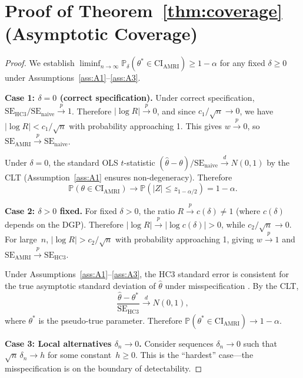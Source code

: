 \documentclass[12pt]{article}
\theoremstyle{definition}
\theoremstyle{remark}
\newcommand{\Prob}{\mathbb{P}}
\newcommand{\se}{\mathrm{SE}}
\newcommand{\CI}{\mathrm{CI}}
\newcommand{\plim}{\overset{p}{\to}}
\newcommand{\dlim}{\overset{d}{\to}}
\begin{document}
\section{Proof of Theorem~\ref{thm:coverage} (Asymptotic Coverage)}\label{app:thm2}

\begin{proof}
We establish $\liminf_{n \to \infty} \Prob_\delta(\theta^* \in \CI_{\mathrm{AMRI}}) \geq 1 - \alpha$ for any fixed $\delta \geq 0$ under Assumptions~\ref{ass:A1}--\ref{ass:A3}.

\textbf{Case 1: $\delta = 0$ (correct specification).}
Under correct specification, $\se_{\mathrm{HC3}}/\se_{\mathrm{naive}} \plim 1$. Therefore $|\log R| \plim 0$, and since $c_1/\sqrt{n} \to 0$, we have $|\log R| < c_1/\sqrt{n}$ with probability approaching 1. This gives $w \plim 0$, so $\se_{\mathrm{AMRI}} \plim \se_{\mathrm{naive}}$.

Under $\delta = 0$, the standard OLS $t$-statistic $(\hat\theta - \theta)/\se_{\mathrm{naive}} \dlim N(0, 1)$ by the CLT (Assumption~\ref{ass:A1} ensures non-degeneracy). Therefore
\[
\Prob(\theta \in \CI_{\mathrm{AMRI}}) \to \Prob(|Z| \leq z_{1-\alpha/2}) = 1 - \alpha.
\]

\textbf{Case 2: $\delta > 0$ fixed.}
For fixed $\delta > 0$, the ratio $R \plim c(\delta) \neq 1$ (where $c(\delta)$ depends on the DGP). Therefore $|\log R| \plim |\log c(\delta)| > 0$, while $c_2/\sqrt{n} \to 0$. For large~$n$, $|\log R| > c_2/\sqrt{n}$ with probability approaching 1, giving $w \plim 1$ and $\se_{\mathrm{AMRI}} \plim \se_{\mathrm{HC3}}$.

Under Assumptions~\ref{ass:A1}--\ref{ass:A3}, the HC3 standard error is consistent for the true asymptotic standard deviation of $\hat\theta$ under misspecification \citep{white1980heteroskedasticity, mackinnon1985some}. By the CLT,
\[
\frac{\hat\theta - \theta^*}{\se_{\mathrm{HC3}}} \dlim N(0, 1),
\]
where $\theta^*$ is the pseudo-true parameter. Therefore $\Prob(\theta^* \in \CI_{\mathrm{AMRI}}) \to 1 - \alpha$.

\textbf{Case 3: Local alternatives $\delta_n \to 0$.}
Consider sequences $\delta_n \to 0$ such that $\sqrt{n}\, \delta_n \to h$ for some constant~$h \geq 0$. This is the ``hardest'' case---the misspecification is on the boundary of detectability.


\end{proof}
\end{document}
